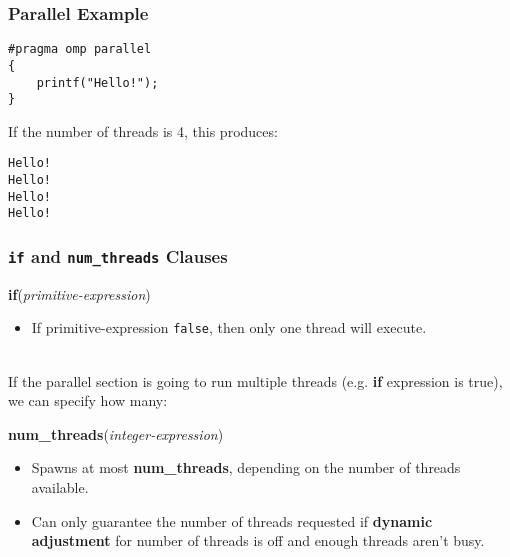 \documentclass[aspectratio=43]{beamer}
\newenvironment{changemargin}[1]{%
  \begin{list}{}{%
    \setlength{\topsep}{0pt}%
    \setlength{\leftmargin}{#1}%
    \setlength{\rightmargin}{1em}
    \setlength{\listparindent}{\parindent}%
    \setlength{\itemindent}{\parindent}%
    \setlength{\parsep}{\parskip}%
  }%
  \item[]}{\end{list}}
\begin{document}
\begin{frame}[fragile]
  \frametitle{Parallel Example}

  \begin{changemargin}{2.5cm}

  \begin{lstlisting}[langauge=C]
#pragma omp parallel
{
    printf("Hello!");
}
  \end{lstlisting}
  \vfill
  If the number of threads is 4, this produces:
  \vfill
  \begin{lstlisting}[langauge=C]
Hello!
Hello!
Hello!
Hello!
  \end{lstlisting}
  \end{changemargin}


\end{frame}

\begin{frame}[fragile]
  \frametitle{{\tt if} and {\tt num\_threads} Clauses}

  \begin{changemargin}{2.5cm}
  \begin{center}
    {\bf if}({\it primitive-expression})    
  \end{center}
  \begin{itemize}
    \item If primitive-expression {\tt false}, then only one thread will execute.
  \end{itemize}~\\

  If the parallel section is going to run multiple threads (e.g. {\bf if} expression
  is true), we can specify how many:
  \begin{center}
    {\bf num\_threads}({\it integer-expression})    
  \end{center}
  \begin{itemize}
    \item Spawns at most {\bf num\_threads}, depending on the number of
      threads available.
    \item Can only guarantee the number of threads requested if
      {\bf dynamic adjustment} for number of threads is off and 
      enough threads aren't busy.
  \end{itemize}
  \end{changemargin}

\end{frame}
\end{document}

